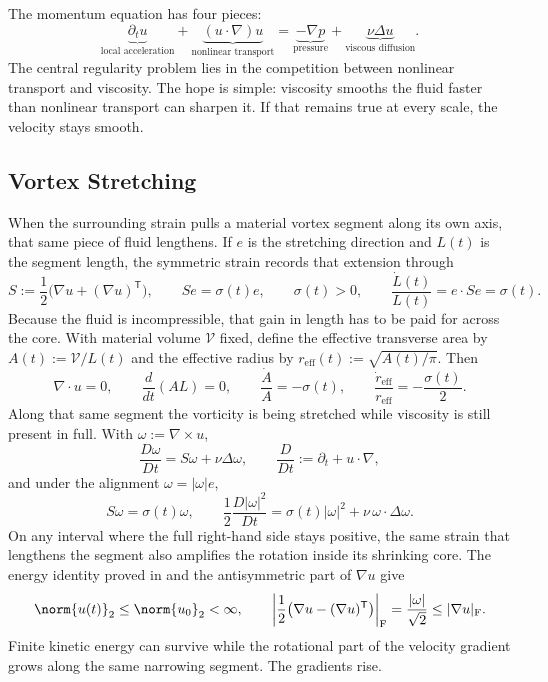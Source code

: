 
The momentum equation has four pieces:
\[
  \underbrace{\partial_t u}_{\text{local acceleration}}
  +
  \underbrace{(u\cdot\nabla)u}_{\text{nonlinear transport}}
  =
  \underbrace{-\nabla p}_{\text{pressure}}
  +
  \underbrace{\nu\Delta u}_{\text{viscous diffusion}}.
\]
The central regularity problem lies in the competition between nonlinear transport and viscosity.
The hope is simple: viscosity smooths the fluid faster than nonlinear transport can sharpen it.
If that remains true at every scale, the velocity stays smooth.

\subsection{Vortex Stretching}\label{sub:ThePerfectlyStretchingVortex}

When the surrounding strain pulls a material vortex segment along its own axis, that same piece of fluid lengthens. If \(e\) is the stretching direction and \(L(t)\) is the segment length, the symmetric strain records that extension through
\[
  S:=\frac12\bigl(\nabla u+(\nabla u)^{\mathsf T}\bigr),
  \qquad
  Se=\sigma(t)e,
  \qquad
  \sigma(t)>0,
  \qquad
  \frac{\dot L(t)}{L(t)}
  =
  e\cdot Se
  =
  \sigma(t).
\]
Because the fluid is incompressible, that gain in length has to be paid for across the core. With material volume \(\mathcal V\) fixed, define the effective transverse area by \(A(t):=\mathcal V/L(t)\) and the effective radius by \(r_{\mathrm{eff}}(t):=\sqrt{A(t)/\pi}\). Then
\[
  \nabla\cdot u=0,
  \qquad
  \frac{d}{dt}(A L)=0,
  \qquad
  \frac{\dot A}{A}=-\sigma(t),
  \qquad
  \frac{\dot r_{\mathrm{eff}}}{r_{\mathrm{eff}}}
  =
  -\frac{\sigma(t)}{2}.
\]
Along that same segment the vorticity is being stretched while viscosity is still present in full. With \(\omega:=\nabla\times u\),
\[
  \frac{D\omega}{Dt}
  =
  S\omega+\nu\Delta\omega,
  \qquad
  \frac{D}{Dt}
  :=
  \partial_t+u\cdot\nabla,
\]
and under the alignment \(\omega=|\omega|e\),
\[
  S\omega
  =
  \sigma(t)\omega,
  \qquad
  \frac12\frac{D|\omega|^2}{Dt}
  =
  \sigma(t)|\omega|^2
  +
  \nu\,\omega\cdot\Delta\omega.
\]
On any interval where the full right-hand side stays positive, the same strain that lengthens the segment also amplifies the rotation inside its shrinking core. The energy identity proved in  and the antisymmetric part of \(\nabla u\) give
\[
  \norm{u(t)}_2
  \leq
  \norm{u_0}_2
  <\infty,
  \qquad
  \left|\frac12\bigl(\nabla u-(\nabla u)^{\mathsf T}\bigr)\right|_{\mathrm F}
  =
  \frac{|\omega|}{\sqrt2}
  \leq
  |\nabla u|_{\mathrm F}.
\]
Finite kinetic energy can survive while the rotational part of the velocity gradient grows along the same narrowing segment. The gradients rise.

